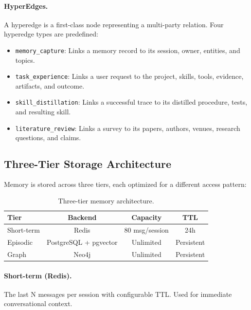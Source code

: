 \documentclass[11pt,a4paper]{article}
\begin{document}
\paragraph{HyperEdges.}
A hyperedge is a first-class node representing a multi-party relation.
Four hyperedge types are predefined:

\begin{itemize}
    \item \texttt{memory\_capture}: Links a memory record to its session, owner, entities, and topics.
    \item \texttt{task\_experience}: Links a user request to the project, skills, tools, evidence, artifacts, and outcome.
    \item \texttt{skill\_distillation}: Links a successful trace to its distilled procedure, tests, and resulting skill.
    \item \texttt{literature\_review}: Links a survey to its papers, authors, venues, research questions, and claims.
\end{itemize}

\subsection{Three-Tier Storage Architecture}

Memory is stored across three tiers, each optimized for a different access pattern:

\begin{table}[t]
    \centering
    \caption{Three-tier memory architecture.}
    \label{tab:tiers}
    \begin{tabular}{lccc}
        \toprule
        Tier & Backend & Capacity & TTL \\
        \midrule
        Short-term & Redis & 80 msg/session & 24h \\
        Episodic & PostgreSQL + pgvector & Unlimited & Persistent \\
        Graph & Neo4j & Unlimited & Persistent \\
        \bottomrule
    \end{tabular}
\end{table}

\paragraph{Short-term (Redis).}
The last N messages per session with configurable TTL.
Used for immediate conversational context.
\end{document}
